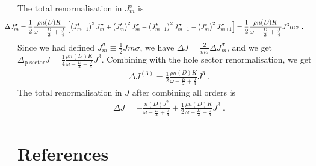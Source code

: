 \documentclass[12pt]{iopart}
\begin{document}
The total renormalisation in  \(J^\sigma_m\) is
\begin{eqnarray}
	\hspace*{-20pt}\Delta J^\sigma_m = \frac{1}{2}\frac{\rho n(D) K}{\omega - \frac{D}{2} + \frac{J}{4}}\left[\left( J^t_{m-1} \right)^2 J^\sigma_m + \left( J^t_m \right)^2 J^\sigma_m - \left( J^t_{m-1} \right)^2 J^\sigma_{m-1} - \left(J^t_m\right)^2 J^\sigma_{m+1} \right] = \frac{1}{2}\frac{\rho n(D) K}{\omega - \frac{D}{2} + \frac{J}{4}}J^3 m \sigma~.\qquad
\end{eqnarray}
Since we had defined \(J^\sigma_m \equiv \frac{1}{2}J m \sigma\), we have \(\Delta J = \frac{2}{m\sigma}\Delta J^\sigma_m\), and we get \(\Delta_\text{p sector} J = \frac{1}{4}\frac{\rho n(D) K}{\omega - \frac{D}{2} + \frac{J}{4}}J^3\).
Combining with the hole sector renormalisation, we get
\begin{eqnarray}
	\Delta J^{(3)} = \frac{1}{2}\frac{\rho n(D) K}{\omega - \frac{D}{2} + \frac{J}{4}}J^3~.
\end{eqnarray}
The total renormalisation in \(J\) after combining all orders is
\begin{eqnarray}
	\Delta J = -\frac{n(D) J^2}{\omega - \frac{D}{2} + \frac{J}{4}} + \frac{1}{2}\frac{\rho n(D) K}{\omega - \frac{D}{2} + \frac{J}{4}}J^3~.
\end{eqnarray}

\section*{References}


\end{document}
